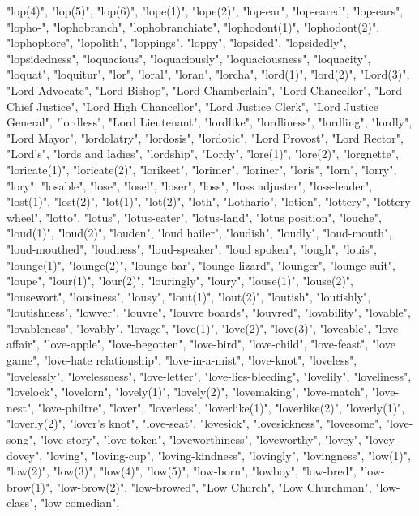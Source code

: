 "lop(4)",
"lop(5)",
"lop(6)",
"lope(1)",
"lope(2)",
"lop-ear",
"lop-eared",
"lop-ears",
"lopho-",
"lophobranch",
"lophobranchiate",
"lophodont(1)",
"lophodont(2)",
"lophophore",
"lopolith",
"loppings",
"loppy",
"lopsided",
"lopsidedly",
"lopsidedness",
"loquacious",
"loquaciously",
"loquaciousness",
"loquacity",
"loquat",
"loquitur",
"lor",
"loral",
"loran",
"lorcha",
"lord(1)",
"lord(2)",
"Lord(3)",
"Lord Advocate",
"Lord Bishop",
"Lord Chamberlain",
"Lord Chancellor",
"Lord Chief Justice",
"Lord High Chancellor",
"Lord Justice Clerk",
"Lord Justice General",
"lordless",
"Lord Lieutenant",
"lordlike",
"lordliness",
"lordling",
"lordly",
"Lord Mayor",
"lordolatry",
"lordosis",
"lordotic",
"Lord Provost",
"Lord Rector",
"Lord's",
"lords and ladies",
"lordship",
"Lordy",
"lore(1)",
"lore(2)",
"lorgnette",
"loricate(1)",
"loricate(2)",
"lorikeet",
"lorimer",
"loriner",
"loris",
"lorn",
"lorry",
"lory",
"losable",
"lose",
"losel",
"loser",
"loss",
"loss adjuster",
"loss-leader",
"lost(1)",
"lost(2)",
"lot(1)",
"lot(2)",
"loth",
"Lothario",
"lotion",
"lottery",
"lottery wheel",
"lotto",
"lotus",
"lotus-eater",
"lotus-land",
"lotus position",
"louche",
"loud(1)",
"loud(2)",
"louden",
"loud hailer",
"loudish",
"loudly",
"loud-mouth",
"loud-mouthed",
"loudness",
"loud-speaker",
"loud spoken",
"lough",
"louis",
"lounge(1)",
"lounge(2)",
"lounge bar",
"lounge lizard",
"lounger",
"lounge suit",
"loupe",
"lour(1)",
"lour(2)",
"louringly",
"loury",
"louse(1)",
"louse(2)",
"lousewort",
"lousiness",
"lousy",
"lout(1)",
"lout(2)",
"loutish",
"loutishly",
"loutishness",
"lowver",
"louvre",
"louvre boards",
"louvred",
"lovability",
"lovable",
"lovableness",
"lovably",
"lovage",
"love(1)",
"love(2)",
"love(3)",
"loveable",
"love affair",
"love-apple",
"love-begotten",
"love-bird",
"love-child",
"love-feast",
"love game",
"love-hate relationship",
"love-in-a-mist",
"love-knot",
"loveless",
"lovelessly",
"lovelessness",
"love-letter",
"love-lies-bleeding",
"lovelily",
"loveliness",
"lovelock",
"lovelorn",
"lovely(1)",
"lovely(2)",
"lovemaking",
"love-match",
"love-nest",
"love-philtre",
"lover",
"loverless",
"loverlike(1)",
"loverlike(2)",
"loverly(1)",
"loverly(2)",
"lover's knot",
"love-seat",
"lovesick",
"lovesickness",
"lovesome",
"love-song",
"love-story",
"love-token",
"loveworthiness",
"loveworthy",
"lovey",
"lovey-dovey",
"loving",
"loving-cup",
"loving-kindness",
"lovingly",
"lovingness",
"low(1)",
"low(2)",
"low(3)",
"low(4)",
"low(5)",
"low-born",
"lowboy",
"low-bred",
"low-brow(1)",
"low-brow(2)",
"low-browed",
"Low Church",
"Low Churchman",
"low-class",
"low comedian",

